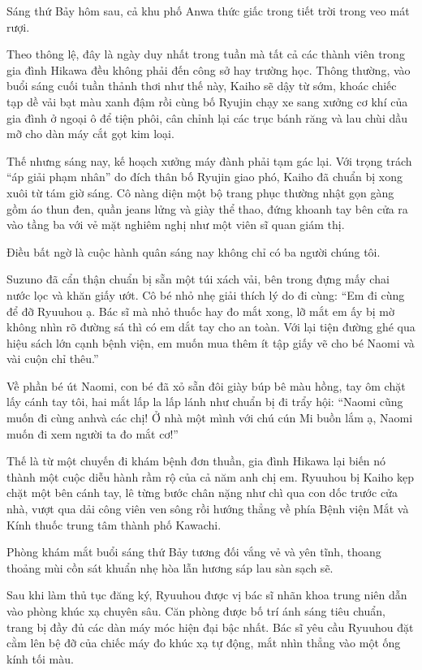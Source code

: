 \documentclass[../main.tex]{subfiles}
\begin{document}

Sáng thứ Bảy hôm sau, cả khu phố Anwa thức giấc trong tiết trời trong veo mát rượi.

Theo thông lệ, đây là ngày duy nhất trong tuần mà tất cả các thành viên trong gia đình Hikawa đều không phải đến công sở hay trường học. Thông thường, vào buổi sáng cuối tuần thảnh thơi như thế này, Kaiho sẽ dậy từ sớm, khoác chiếc tạp dề vải bạt màu xanh đậm rồi cùng bố Ryujin chạy xe sang xưởng cơ khí của gia đình ở ngoại ô để tiện phôi, cân chỉnh lại các trục bánh răng và lau chùi dầu mỡ cho dàn máy cắt gọt kim loại.

Thế nhưng sáng nay, kế hoạch xưởng máy đành phải tạm gác lại. Với trọng trách ``áp giải phạm nhân'' do đích thân bố Ryujin giao phó, Kaiho đã chuẩn bị xong xuôi từ tám giờ sáng. Cô nàng diện một bộ trang phục thường nhật gọn gàng gồm áo thun đen, quần jeans lửng và giày thể thao, đứng khoanh tay bên cửa ra vào tầng ba với vẻ mặt nghiêm nghị như một viên sĩ quan giám thị.

Điều bất ngờ là cuộc hành quân sáng nay không chỉ có ba người chúng tôi.

Suzuno đã cẩn thận chuẩn bị sẵn một túi xách vải, bên trong đựng mấy chai nước lọc và khăn giấy ướt. Cô bé nhỏ nhẹ giải thích lý do đi cùng: ``Em đi cùng để đỡ Ryuuhou ạ. Bác sĩ mà nhỏ thuốc hay đo mắt xong, lỡ mắt em ấy bị mờ không nhìn rõ đường sá thì có em dắt tay cho an toàn. Với lại tiện đường ghé qua hiệu sách lớn cạnh bệnh viện, em muốn mua thêm ít tập giấy vẽ cho bé Naomi và vài cuộn chỉ thêu.''

Về phần bé út Naomi, con bé đã xỏ sẵn đôi giày búp bê màu hồng, tay ôm chặt lấy cánh tay tôi, hai mắt lấp la lấp lánh như chuẩn bị đi trẩy hội: ``Naomi cũng muốn đi cùng anhvà các chị! Ở nhà một mình với chú cún Mi buồn lắm ạ, Naomi muốn đi xem người ta đo mắt cơ!''

Thế là từ một chuyến đi khám bệnh đơn thuần, gia đình Hikawa lại biến nó thành một cuộc diễu hành rầm rộ của cả năm anh chị em. Ryuuhou bị Kaiho kẹp chặt một bên cánh tay, lê từng bước chân nặng như chì qua con dốc trước cửa nhà, vượt qua dải công viên ven sông rồi hướng thẳng về phía Bệnh viện Mắt và Kính thuốc trung tâm thành phố Kawachi.

\ct

Phòng khám mắt buổi sáng thứ Bảy tương đối vắng vẻ và yên tĩnh, thoang thoảng mùi cồn sát khuẩn nhẹ hòa lẫn hương sáp lau sàn sạch sẽ.

Sau khi làm thủ tục đăng ký, Ryuuhou được vị bác sĩ nhãn khoa trung niên dẫn vào phòng khúc xạ chuyên sâu. Căn phòng được bố trí ánh sáng tiêu chuẩn, trang bị đầy đủ các dàn máy móc hiện đại bậc nhất. Bác sĩ yêu cầu Ryuuhou đặt cằm lên bệ đỡ của chiếc máy đo khúc xạ tự động, mắt nhìn thẳng vào một ống kính tối màu.
\end{document}
